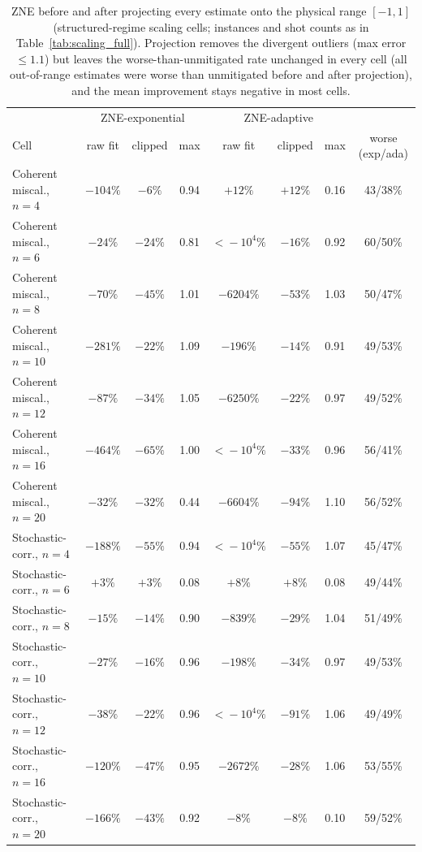 \begin{table}[t]
\caption{ZNE before and after projecting every estimate onto the physical range $[-1,1]$ (structured-regime scaling cells; instances and shot counts as in Table~\ref{tab:scaling_full}). Projection removes the divergent outliers (max error $\le 1.1$) but leaves the worse-than-unmitigated rate unchanged in every cell (all out-of-range estimates were worse than unmitigated before and after projection), and the mean improvement stays negative in most cells.}
\label{tab:clip_full}
\centering\small
\begin{tabular}{l|ccc|ccc|c}
\toprule
 & \multicolumn{3}{c|}{ZNE-exponential} & \multicolumn{3}{c|}{ZNE-adaptive} & \\
Cell & raw fit & clipped & max & raw fit & clipped & max & worse (exp/ada) \\
\midrule
Coherent miscal., $n{=}4$ & $-104\%$ & $-6\%$ & 0.94 & $+12\%$ & $+12\%$ & 0.16 & 43/38\% \\
Coherent miscal., $n{=}6$ & $-24\%$ & $-24\%$ & 0.81 & $<\!-10^4\%$ & $-16\%$ & 0.92 & 60/50\% \\
Coherent miscal., $n{=}8$ & $-70\%$ & $-45\%$ & 1.01 & $-6204\%$ & $-53\%$ & 1.03 & 50/47\% \\
Coherent miscal., $n{=}10$ & $-281\%$ & $-22\%$ & 1.09 & $-196\%$ & $-14\%$ & 0.91 & 49/53\% \\
Coherent miscal., $n{=}12$ & $-87\%$ & $-34\%$ & 1.05 & $-6250\%$ & $-22\%$ & 0.97 & 49/52\% \\
Coherent miscal., $n{=}16$ & $-464\%$ & $-65\%$ & 1.00 & $<\!-10^4\%$ & $-33\%$ & 0.96 & 56/41\% \\
Coherent miscal., $n{=}20$ & $-32\%$ & $-32\%$ & 0.44 & $-6604\%$ & $-94\%$ & 1.10 & 56/52\% \\
\midrule
Stochastic-corr., $n{=}4$ & $-188\%$ & $-55\%$ & 0.94 & $<\!-10^4\%$ & $-55\%$ & 1.07 & 45/47\% \\
Stochastic-corr., $n{=}6$ & $+3\%$ & $+3\%$ & 0.08 & $+8\%$ & $+8\%$ & 0.08 & 49/44\% \\
Stochastic-corr., $n{=}8$ & $-15\%$ & $-14\%$ & 0.90 & $-839\%$ & $-29\%$ & 1.04 & 51/49\% \\
Stochastic-corr., $n{=}10$ & $-27\%$ & $-16\%$ & 0.96 & $-198\%$ & $-34\%$ & 0.97 & 49/53\% \\
Stochastic-corr., $n{=}12$ & $-38\%$ & $-22\%$ & 0.96 & $<\!-10^4\%$ & $-91\%$ & 1.06 & 49/49\% \\
Stochastic-corr., $n{=}16$ & $-120\%$ & $-47\%$ & 0.95 & $-2672\%$ & $-28\%$ & 1.06 & 53/55\% \\
Stochastic-corr., $n{=}20$ & $-166\%$ & $-43\%$ & 0.92 & $-8\%$ & $-8\%$ & 0.10 & 59/52\% \\
\bottomrule
\end{tabular}
\end{table}
